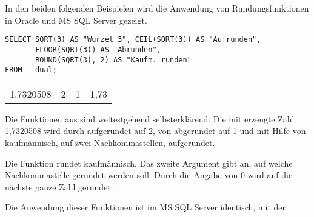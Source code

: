         In den beiden folgenden Beispielen wird die Anwendung von
        Rundungsfunktionen in Oracle und MS SQL Server gezeigt.
        \begin{lstlisting}[language=oracle_sql,caption={Rundungsfunktionen in Oracle},label=sql03_15]
SELECT SQRT(3) AS "Wurzel 3", CEIL(SQRT(3)) AS "Aufrunden",
       FLOOR(SQRT(3)) AS "Abrunden",
       ROUND(SQRT(3), 2) AS "Kaufm. runden"
FROM   dual;
        \end{lstlisting}
        \begin{center}
          \begin{small}
            \tablehead{}
            \begin{oraclesql}
              \begin{supertabular}{rrrr}
                1,7320508 & 2 & 1 & 1,73 \\
              \end{supertabular}
            \end{oraclesql}
          \end{small}
        \end{center}
        Die Funktionen aus  sind weitestgehend
        selbsterkl\"arend. Die mit  erzeugte Zahl
        1,7320508 wird durch  aufgerundet auf 2, von
         abgerundet auf 1 und mit Hilfe von
         kaufm\"annisch, auf zwei Nachkommastellen,
        aufgerundet.
        \begin{merke}
          Die Funktion  rundet kaufm\"annisch. Das zweite
          Argument gibt an, auf welche Nachkommastelle gerundet werden soll.
          Durch die Angabe von 0 wird auf die n\"achste ganze Zahl gerundet.
        \end{merke}
        Die Anwendung dieser Funktionen ist im MS SQL Server identisch, mit der
